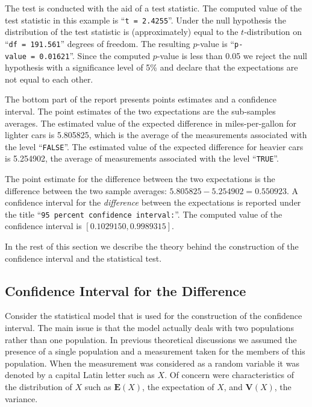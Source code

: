 \documentclass[]{krantz}
\newcommand{\Expec}{\mathbf{E}}
\newcommand{\Var}{\mathbf{V}}
\theoremstyle{definition}
\theoremstyle{definition}
\theoremstyle{definition}
\theoremstyle{remark}
\begin{document}
The test is conducted with the aid of a test statistic. The computed
value of the test statistic in this example is ``\texttt{t\ =\ 2.4255}''. Under the
null hypothesis the distribution of the test statistic is
(approximately) equal to the \(t\)-distribution on ``\texttt{df\ =\ 191.561}''
degrees of freedom. The resulting \(p\)-value is ``\texttt{p-value\ =\ 0.01621}''.
Since the computed \(p\)-value is less than 0.05 we reject the null
hypothesis with a significance level of 5\% and declare that the
expectations are not equal to each other.

The bottom part of the report presents points estimates and a confidence
interval. The point estimates of the two expectations are the
sub-samples averages. The estimated value of the expected difference in
miles-per-gallon for lighter cars is 5.805825, which is the average of
the measurements associated with the level ``\texttt{FALSE}''. The estimated
value of the expected difference for heavier cars is 5.254902, the
average of measurements associated with the level ``\texttt{TRUE}''.

The point estimate for the difference between the two expectations is
the difference between the two sample averages:
\(5.805825 - 5.254902 = 0.550923\). A confidence interval for the
\emph{difference} between the expectations is reported under the title
``\texttt{95\ percent\ confidence\ interval:}''. The computed value of the
confidence interval is \([0.1029150, 0.9989315]\).

In the rest of this section we describe the theory behind the
construction of the confidence interval and the statistical test.

\hypertarget{confidence-interval-for-the-difference}{%
\subsection{Confidence Interval for the Difference}\label{confidence-interval-for-the-difference}}

Consider the statistical model that is used for the construction of the
confidence interval. The main issue is that the model actually deals
with two populations rather than one population. In previous theoretical
discussions we assumed the presence of a single population and a
measurement taken for the members of this population. When the
measurement was considered as a random variable it was denoted by a
capital Latin letter such as \(X\). Of concern were characteristics of the
distribution of \(X\) such as \(\Expec(X)\), the expectation of \(X\), and
\(\Var(X)\), the variance.
\end{document}
